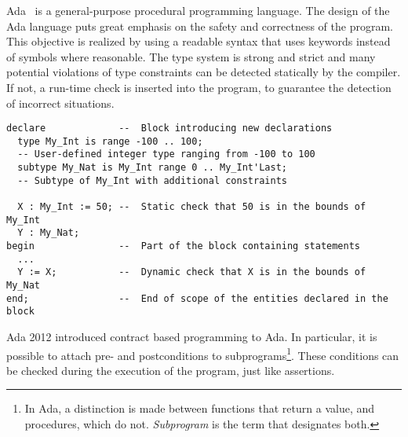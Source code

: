 \documentclass[runningheads]{llncs}
\begin{document}
Ada~\cite{ada} is a general-purpose procedural programming language. %
The design of the Ada language puts great emphasis on the safety and correctness of the program. This objective is realized by using a readable syntax that uses keywords instead of symbols where reasonable. The type system %
is strong and strict %
and many potential violations of type constraints can be detected statically by the compiler. If not, a run-time check is inserted into the program, to guarantee the detection of incorrect situations. %
\begin{lstlisting}
declare             --  Block introducing new declarations
  type My_Int is range -100 .. 100;
  -- User-defined integer type ranging from -100 to 100
  subtype My_Nat is My_Int range 0 .. My_Int'Last;
  -- Subtype of My_Int with additional constraints

  X : My_Int := 50; --  Static check that 50 is in the bounds of My_Int
  Y : My_Nat;
begin               --  Part of the block containing statements
  ...
  Y := X;           --  Dynamic check that X is in the bounds of My_Nat
end;                --  End of scope of the entities declared in the block
\end{lstlisting}
Ada 2012 %
introduced contract based programming to Ada. In particular, it is possible to attach pre- and postconditions to subprograms\footnote{In Ada, a distinction is made between functions that return a value, and procedures, which do not. \emph{Subprogram} is the term that designates both.}. %
These conditions can be checked during the execution of the program, just like assertions.
\end{document}

